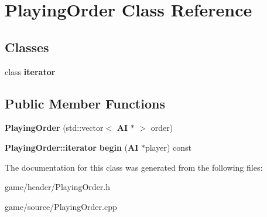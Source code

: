\section{Playing\-Order Class Reference}
\label{class_playing_order}
\subsection*{Classes}
\begin{DoxyCompactItemize}
\item 
class {\bf iterator}
\end{DoxyCompactItemize}
\subsection*{Public Member Functions}
\begin{DoxyCompactItemize}
\item 
{\bfseries Playing\-Order} (std\-::vector$<$ {\bf A\-I} $\ast$ $>$ order)\label{class_playing_order_a7f530887195bc39170e48628fe33a2e8}

\item 
{\bf Playing\-Order\-::iterator} {\bfseries begin} ({\bf A\-I} $\ast$player) const \label{class_playing_order_ae84e1df8d1e7cbce8787895375a1a1f2}

\end{DoxyCompactItemize}


The documentation for this class was generated from the following files\-:\begin{DoxyCompactItemize}
\item 
game/header/Playing\-Order.\-h\item 
game/source/Playing\-Order.\-cpp\end{DoxyCompactItemize}
